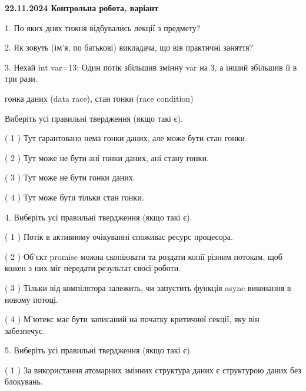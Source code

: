 \documentclass[12pt, ukrainian]{article}
\begin{document}
\vspace{4mm}
\newpage
\begin {large}

\textbf{22.11.2024 Контрольна робота, варіант  }\par


{
1. По яких днях тижня відбувались лекції з предмету?



\vspace{5mm}
2. Як зовуть (ім'я, по батькові) викладача, що вів практичні заняття?



\vspace{5mm}
3. Нехай int var=13; Один потік збільшив змінну var на 3, а інший збільшив її в три рази.

гонка даних (data race), стан гонки (race condition)

Виберіть усі правильні твердження (якщо такі є).\par
\vspace{2mm}
( 1 ) Тут гарантовано нема гонки даних, але може бути стан гонки.%

( 2 ) Тут може не бути ані гонки даних, ані стану гонки.%

( 3 ) Тут може не бути гонки даних.%

( 4 ) Тут може бути тільки стан гонки.%


\vspace{5mm}
4. Виберіть усі правильні твердження (якщо такі є).\par
\vspace{2mm}

( 1 ) Потік в активному очікуванні споживає ресурс процесора.%

( 2 ) Об’єкт promise можна скопіювати та роздати копії різним потокам, щоб кожен з них міг передати результат своєї роботи.%

( 3 ) Тільки від компілятора залежить, чи запустить функція async виконання в новому потоці.%

( 4 ) М’ютекс має бути записаний на початку критичної секції, яку він забезпечує.%


\vspace{5mm}
5. Виберіть усі правильні твердження (якщо такі є).\par
\vspace{2mm}

( 1 ) За використання атомарних змінних структура даних є структурою даних без блокувань.%

}
\end{large}
\end{document}
